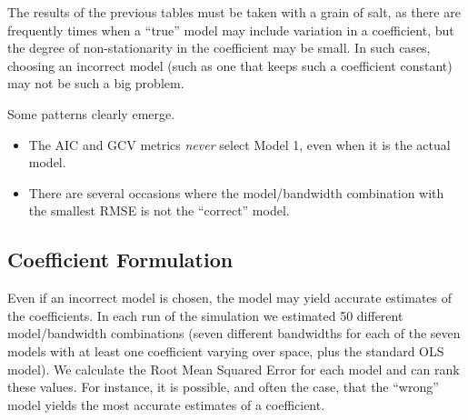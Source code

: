 \documentclass{article}\usepackage{graphicx, color}
\begin{document}
The results of the previous tables must be taken with a grain of salt, as there are frequently times when a ``true'' model may include variation in a coefficient, but the degree of non-stationarity in the coefficient may be small. In such cases, choosing an incorrect model (such as one that keeps such a coefficient constant) may not be such a big problem. 

Some patterns clearly emerge. 
\begin{itemize}
\item The AIC and GCV metrics \emph{never} select Model 1, even when it is the actual model.
\item There are several occasions where the model/bandwidth combination with the smallest RMSE is not the ``correct'' model.
\end{itemize}

\subsection{Coefficient Formulation}

Even if an incorrect model is chosen, the model may yield accurate estimates of the coefficients. In each run of the simulation we estimated 50 different model/bandwidth combinations (seven different bandwidths for each of the seven models with at least one coefficient varying over space, plus the standard OLS model). We calculate the Root Mean Squared Error for each model and can rank these values. For instance, it is possible, and often the case, that the ``wrong'' model yields the most accurate estimates of a coefficient.
\end{document}
